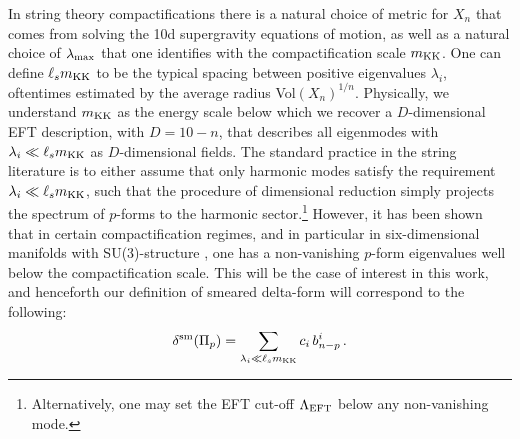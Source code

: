 \documentclass[11pt]{article}
\def\be{\begin{equation}}
\def\ee{\end{equation}}
\begin{document}
In string theory compactifications there is a natural choice of metric for $X_n$ that comes from solving the 10d supergravity equations of motion, as well as a natural choice of $\lambda_{\rm max}$ that one identifies with the compactification scale $m_{\rm KK}$. One can define $\ell_s m_{\rm KK}$ to be the typical spacing between positive eigenvalues $\lambda_i$, oftentimes estimated by the average radius Vol$(X_n)^{1/n}$. Physically, we understand $m_{\rm KK}$ as the energy scale below which we recover a $D$-dimensional EFT description, with $D=10-n$, that describes all eigenmodes with $\lambda_i \ll \ell_s m_{\rm KK}$  as $D$-dimensional fields. The standard practice in the string literature is to either assume that only harmonic modes satisfy the requirement $\lambda_i \ll \ell_s m_{\rm KK}$, such that the procedure of dimensional reduction simply projects the spectrum of $p$-forms to the harmonic sector.\footnote{Alternatively, one may set the EFT cut-off $\Lambda_{\rm EFT}$ below any non-vanishing mode.} However, it has been shown that in certain compactification regimes, and in particular in six-dimensional manifolds with SU(3)-structure \cite{Gray1980TheSC,chiossi2002intrinsic,Hull:1986iu,Strominger:1986uh,LopesCardoso:2002vpf,Gauntlett:2003cy,Grana:2005jc,Koerber:2010bx}, one has a non-vanishing $p$-form eigenvalues well below the compactification scale. This will be the case of interest in this work, and henceforth our definition of smeared delta-form will correspond to the following:
\be
\delta^{\rm sm} (\Pi_p) = \sum_{\lambda_i \ll \ell_s m_{\rm KK}} c_i  \, b^{i}_{n-p}\, .
\label{deltasm}
\ee
\end{document}
